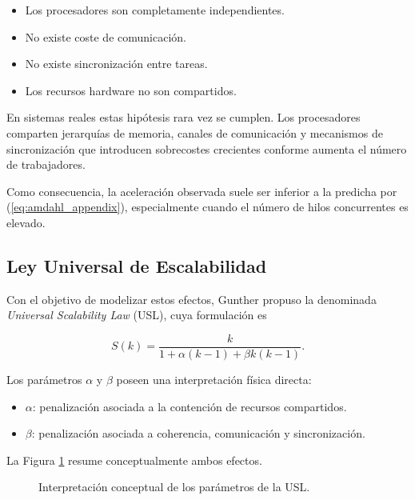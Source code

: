 \documentclass[11pt]{article}
\begin{document}
\begin{itemize}
\item Los procesadores son completamente independientes.
\item No existe coste de comunicación.
\item No existe sincronización entre tareas.
\item Los recursos hardware no son compartidos.
\end{itemize}

En sistemas reales estas hipótesis rara vez se cumplen. Los procesadores comparten jerarquías de memoria, canales de comunicación y mecanismos de sincronización que introducen sobrecostes crecientes conforme aumenta el número de trabajadores.

Como consecuencia, la aceleración observada suele ser inferior a la predicha por (\ref{eq:amdahl_appendix}), especialmente cuando el número de hilos concurrentes es elevado.

\subsection{Ley Universal de Escalabilidad}

Con el objetivo de modelizar estos efectos, Gunther propuso la denominada \emph{Universal Scalability Law} (USL), cuya formulación es

\begin{equation}
S(k)
=
\frac{k}
{1+\alpha(k-1)+\beta k(k-1)}.
\label{eq:usl_appendix}
\end{equation}

Los parámetros \(\alpha\) y \(\beta\) poseen una interpretación física directa:

\begin{itemize}
\item \(\alpha\): penalización asociada a la contención de recursos compartidos.
\item \(\beta\): penalización asociada a coherencia, comunicación y sincronización.
\end{itemize}

La Figura \ref{fig:usl_componentes} resume conceptualmente ambos efectos.

\begin{figure}[H]
\centering
{}
\caption{Interpretación conceptual de los parámetros de la USL.}
\label{fig:usl_componentes}
\end{figure}
\end{document}
